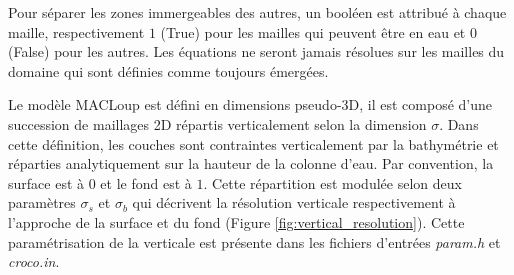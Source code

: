 \documentclass[10pt,a4paper,titlepage]{article}
\begin{document}
Pour séparer les zones immergeables des autres, un booléen est attribué à chaque maille, respectivement $1$ (True) pour les mailles qui peuvent être en eau et $0$ (False) pour les autres.
Les équations ne seront jamais résolues sur les mailles du domaine qui sont définies comme toujours émergées.

Le modèle MACLoup est défini en dimensions pseudo-3D, il est composé d'une succession de maillages 2D répartis verticalement selon la dimension $\sigma$.
Dans cette définition, les couches sont contraintes verticalement par la bathymétrie et réparties analytiquement sur la hauteur de la colonne d'eau.
Par convention, la surface est à $0$ et le fond est à $1$.
Cette répartition est modulée selon deux paramètres $\sigma_{s}$ et $\sigma_{b}$ qui décrivent la résolution verticale respectivement à l'approche de la surface et du fond (Figure \ref{fig:vertical_resolution}).
Cette paramétrisation de la verticale est présente dans les fichiers d'entrées \textit{param.h} et \textit{croco.in}.
\end{document}
